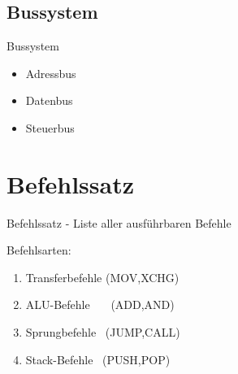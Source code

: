 \documentclass{beamer}
\begin{document}
\subsection{Bussystem}
\begin{frame}{Bussystem}
\centering
\begin{itemize}
\item Adressbus
\bigskip
\item Datenbus
\bigskip
\item Steuerbus
\end{itemize}
\end{frame}

\section{Befehlssatz}
\begin{frame}[t]{Befehlssatz}
- Liste aller ausf\"uhrbaren Befehle\newline\par
Befehlsarten:
\center
\begin{enumerate}
\item{Transferbefehle  (MOV,XCHG)}
\item{ALU-Befehle \ \ \ (ADD,AND)}
\item{Sprungbefehle  \  (JUMP,CALL)}
\item{Stack-Befehle \ (PUSH,POP)}
\end{enumerate}
\end{frame}
\end{document}
